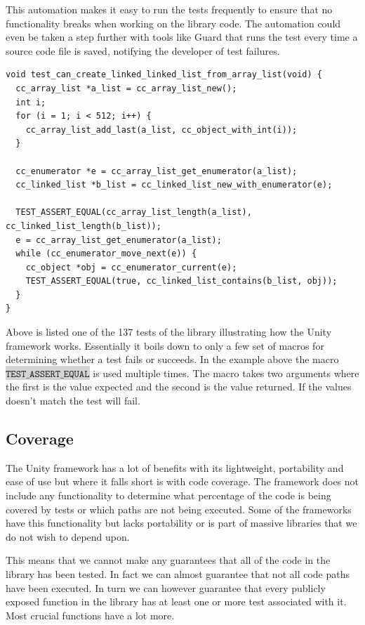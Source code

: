 \documentclass[table]{ituthesis}
\newcommand{\highlight}[1]{\colorbox{lightGray}{$\displaystyle \texttt{#1}$}}
\begin{document}
	This automation makes it easy to run the tests frequently to ensure that no functionality breaks when working on the library code. The automation could even be taken a step further with tools like Guard that runs the test every time a source code file is saved, notifying the developer of test failures.

\begin{lstlisting}[label=test-example,caption=Example of unit test with Unity]
void test_can_create_linked_linked_list_from_array_list(void) {
  cc_array_list *a_list = cc_array_list_new();
  int i;
  for (i = 1; i < 512; i++) {
    cc_array_list_add_last(a_list, cc_object_with_int(i));
  }

  cc_enumerator *e = cc_array_list_get_enumerator(a_list);
  cc_linked_list *b_list = cc_linked_list_new_with_enumerator(e);

  TEST_ASSERT_EQUAL(cc_array_list_length(a_list), cc_linked_list_length(b_list));
  e = cc_array_list_get_enumerator(a_list);
  while (cc_enumerator_move_next(e)) {
    cc_object *obj = cc_enumerator_current(e);
    TEST_ASSERT_EQUAL(true, cc_linked_list_contains(b_list, obj));
  }
}
\end{lstlisting}

	Above is listed one of the 137 tests of the library illustrating how the Unity framework works. Essentially it boils down to only a few set of macros for determining whether a test fails or succeeds. In the example above the macro \highlight{TEST\_ASSERT\_EQUAL} is used multiple times. The macro takes two arguments where the first is the value expected and the second is the value returned. If the values doesn't match the test will fail.

	\subsection{Coverage}
	
	The Unity framework has a lot of benefits with its lightweight, portability and ease of use but where it falls short is with code coverage. The framework does not include any functionality to determine what percentage of the code is being covered by tests or which paths are not being executed. Some of the frameworks have this functionality but lacks portability or is part of massive libraries that we do not wish to depend upon.

	This means that we cannot make any guarantees that all of the code in the library has been tested. In fact we can almost guarantee that not all code paths have been executed. In turn we can however guarantee that every publicly exposed function in the library has at least one or more test associated with it. Most crucial functions have a lot more.
\end{document}
